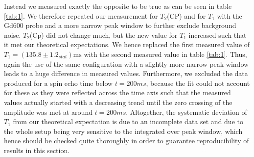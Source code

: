 Instead we measured exactly the opposite to be true as can be seen in table \ref{tab:1}. We therefore repeated our measurement for $T_2$(CP) and for $T_1$ with the Gd600 probe and a more narrow peak window to further exclude background noise. $T_2$(Cp) did not change much, but the new value for $T_1$ increased such that it met our theoretical expectations. We hence replaced the first measured value of $T_1 = \left(135.8 \pm 1.2_{stat}\right)\mathrm{ms}$ with the second measured value in table \ref{tab:1}. Thus, again the use of the same configuration with a slightly more narrow peak window leads to a huge difference in measured values. Furthermore, we excluded the data produced for a spin echo time below $t=200ms$, because the fit could not account for these as they were reflected across the time axis such that the measured values actually started with a decreasing trend until the zero crossing of the amplitude was met at around $t=200ms$. Altogether, the systematic deviation of $T_1$ from our theoretical expectation is due to an incomplete data set and due to the whole setup being very sensitive to the integrated over peak window, which hence should be checked quite thoroughly in order to guarantee reproducibility of results in this section.\\



